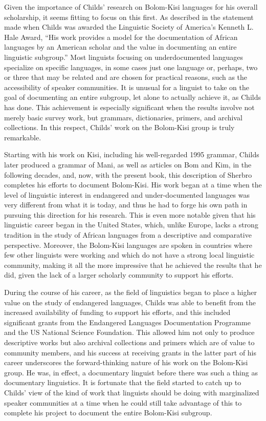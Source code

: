 Given the importance of Childs' research on Bolom-Kisi languages for his overall scholarship, it seems fitting to focus on this first. As described in the statement made when Childs was awarded the Linguistic Society of America's Kenneth L. Hale Award, “His work provides a model for the documentation of African languages by an American scholar and the value in documenting an entire linguistic subgroup.” Most linguists focusing on underdocumented languages specialize on specific languages, in some cases just one language or, perhaps, two or three that may be related and are chosen for practical reasons, such as the accessibility of speaker communities. It is unusual for a linguist to take on the goal of documenting an entire subgroup, let alone to actually achieve it, as Childs has done. This achievement is especially significant when the results involve not merely basic survey work, but grammars, dictionaries, primers, and archival collections. In this respect, Childs' work on the Bolom-Kisi group is truly remarkable.

Starting with his work on Kisi, including his well-regarded 1995 grammar, Childs later produced a grammar of Mani, as well as articles on Bom and Kim, in the following decades, and, now, with the present book, this description of Sherbro completes his efforts to document Bolom-Kisi. His work began at a time when the level of linguistic interest in endangered and under-documented languages was very different from what it is today, and thus he had to forge his own path in pursuing this direction for his research. This is even more notable given that his linguistic career began in the United States, which, unlike Europe, lacks a strong tradition in the study of African languages from a descriptive and comparative perspective. Moreover, the Bolom-Kisi languages are spoken in countries where few other linguists were working and which do not have a strong local linguistic community, making it all the more impressive that he achieved the results that he did, given the lack of a larger scholarly community to support his efforts.

During the course of his career, as the field of linguistics began to place a higher value on the study of endangered languages, Childs was able to benefit from the increased availability of funding to support his efforts, and this included significant grants from the Endangered Languages Documentation Programme and the US National Science Foundation. This allowed him not only to produce descriptive works but also archival collections and primers which are of value to community members, and his success at receiving grants in the latter part of his career underscores the forward-thinking nature of his work on the Bolom-Kisi group. He was, in effect, a documentary linguist before there was such a thing as documentary linguistics. It is fortunate that the field started to catch up to Childs' view of the kind of work that linguists should be doing with marginalized speaker communities at a time when he could still take advantage of this to complete his project to document the entire Bolom-Kisi subgroup.

